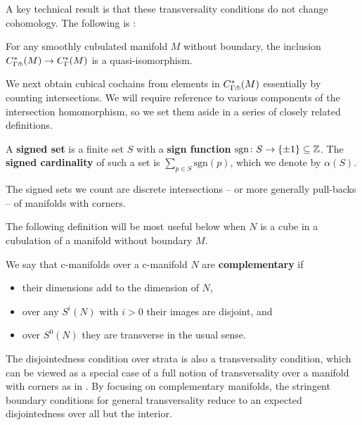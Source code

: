 A key technical result is that these transversality conditions do not change cohomology.
The following is \cite[Theorem 6.5]{medina2022foundations}:

\begin{theorem}\label{T:transverse complex}
	For any smoothly cubulated manifold $M$ without boundary, the inclusion $C^*_{\Gamma \pitchfork}(M) \to C^*_\Gamma(M)$ is a quasi-isomorphism.
\end{theorem}

We next obtain cubical cochains from elements in $C^*_{\Gamma \pitchfork}(M)$ essentially by counting intersections.
We will require reference to various components of the intersection homomorphism, so we set them aside in a series of closely related definitions.

\begin{definition}
	A \textbf{signed set} is a finite set $S$ with a \textbf{sign function} $\mathrm{sgn} \colon S \to \{\pm 1\} \subseteq \mathbb{Z}$.
	The \textbf{signed cardinality} of such a set is $\sum_{p \in S} \mathrm{sgn}(p)$, which we denote by $\alpha(S)$.
\end{definition}

The signed sets we count are discrete intersections -- or more generally pull-backs -- of manifolds with corners.

\begin{comment}
For the following definitions we will consider manifolds with corners mapping to manifolds with corners.
HEREHERE
\end{comment}

The following definition will be most useful below when $N$ is a cube in a cubulation of a manifold without boundary $M$.

\begin{definition}\label{D:complementary}
	We say that c-manifolds over a c-manifold $N$ are \textbf{complementary} if
	\begin{itemize}
		\item their dimensions add to the dimension of $N$,
		\item over any $S^i(N)$ with $i>0$ their images are disjoint, and
		\item over $S^0(N)$ they are transverse in the usual sense.
	\end{itemize}
\end{definition}

The disjointedness condition over strata is also a transversality condition, which can be viewed as a special case of a full notion of transversality over a manifold with corners as in \cite{Joy12}.
By focusing on complementary manifolds, the stringent boundary conditions for general transversality reduce to an expected disjointedness over all but the interior.


